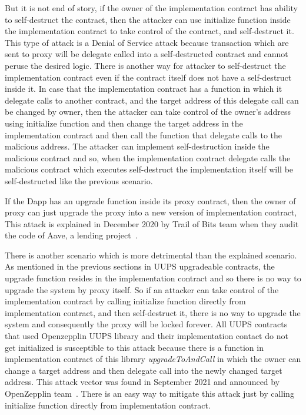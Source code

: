 But it is not end of story, if the owner of the implementation contract has ability to self-destruct the contract, then the attacker can use initialize function inside the implementation contract to take control of the contract, and self-destruct it. This type of attack is a Denial of Service attack because transaction which are sent to proxy will be delegate called into a self-destructed contract and cannot peruse the desired logic. There is another way for attacker to self-destruct the implementation contract even if the contract itself does not have a self-destruct inside it. In case that the implementation contract has a function in which it delegate calls to another contract, and the target address of this delegate call can be changed by owner, then the attacker can take control of the owner's address using initialize function and then change the target address in the implementation contract and then call the function that delegate calls to the malicious address. The attacker can implement self-destruction inside the malicious contract and so, when the implementation contract delegate calls the malicious contract which executes self-destruct the implementation itself will be self-destructed like the previous scenario. 

If the Dapp has an upgrade function inside its proxy contract, then the owner of proxy can just upgrade the proxy into a new version of implementation contract, This attack is explained in December 2020 by Trail of Bits team when they audit the code of Aave, a lending project~\cite{aaveBreak}.

There is another scenario which is more detrimental than the explained scenario. As mentioned in the previous sections in UUPS upgradeable contracts, the upgrade function resides in the implementation contract and so there is no way to upgrade the system by proxy itself. So if an attacker can take control of the implementation contract by calling initialize function directly from implementation contract, and then self-destruct it, there is no way to upgrade the system and consequently the proxy will be locked forever. All UUPS contracts that used Openzepplin UUPS library and their implementation contact do not get initialized is susceptible to this attack because there is a function in implementation contract of this library \textit{upgradeToAndCall} in which the owner can change a target address and then delegate call into the newly changed target address. This attack vector was found in September 2021 and announced by OpenZepplin team~\cite{securityAdvise}\cite{uupsAttacks}. There is an easy way to mitigate this attack just by calling initialize function directly from implementation contract. 

